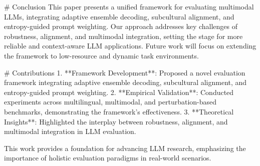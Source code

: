 # Conclusion  
This paper presents a unified framework for evaluating multimodal LLMs, integrating adaptive ensemble decoding, subcultural alignment, and entropy-guided prompt weighting. Our approach addresses key challenges of robustness, alignment, and multimodal integration, setting the stage for more reliable and context-aware LLM applications. Future work will focus on extending the framework to low-resource and dynamic task environments.

# Contributions  
1. **Framework Development**: Proposed a novel evaluation framework integrating adaptive ensemble decoding, subcultural alignment, and entropy-guided prompt weighting.
2. **Empirical Validation**: Conducted experiments across multilingual, multimodal, and perturbation-based benchmarks, demonstrating the framework's effectiveness.
3. **Theoretical Insights**: Highlighted the interplay between robustness, alignment, and multimodal integration in LLM evaluation.

This work provides a foundation for advancing LLM research, emphasizing the importance of holistic evaluation paradigms in real-world scenarios.
